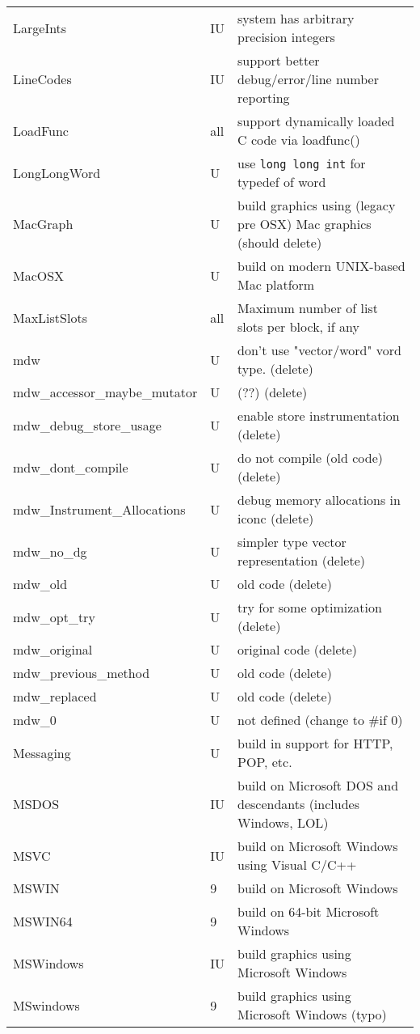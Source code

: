 \begin{xtabular}{|m{1.8in}|m{0.5in}|m{4.0in}|}
LargeInts & IU & system has arbitrary precision integers \\
LineCodes & IU & support better debug/error/line number reporting \\
LoadFunc & all & support dynamically loaded C code via loadfunc() \\
LongLongWord & U & use \texttt{long long int} for typedef of word \\
MacGraph & U & build graphics using (legacy pre OSX) Mac graphics (should delete)  \\
MacOSX & U & build on modern UNIX-based Mac platform \\
MaxListSlots & all & Maximum number of list slots per block, if any \\
mdw & U & don't use "vector/word" vord type. (delete) \\
mdw\_accessor\_maybe\_mutator & U & (??) (delete) \\
mdw\_debug\_store\_usage & U & enable store instrumentation (delete) \\
mdw\_dont\_compile & U & do not compile (old code) (delete) \\
mdw\_Instrument\_Allocations & U & debug memory allocations in iconc (delete) \\
mdw\_no\_dg & U & simpler type vector representation (delete) \\
mdw\_old & U & old code (delete) \\
mdw\_opt\_try & U & try for some optimization (delete) \\
mdw\_original & U & original code (delete) \\
mdw\_previous\_method & U & old code (delete) \\
mdw\_replaced & U & old code (delete) \\
mdw\_0 & U & not defined (change to \#if 0) \\
Messaging & U & build in support for HTTP, POP, etc. \\
MSDOS & IU & build on Microsoft DOS and descendants (includes Windows, LOL) \\
MSVC & IU & build on Microsoft Windows using Visual C/C++ \\
MSWIN & 9 & build on Microsoft Windows \\
MSWIN64 & 9 & build on 64-bit Microsoft Windows \\
MSWindows & IU & build graphics using Microsoft Windows \\
MSwindows & 9 & build graphics using Microsoft Windows (typo) \\

\end{xtabular}
